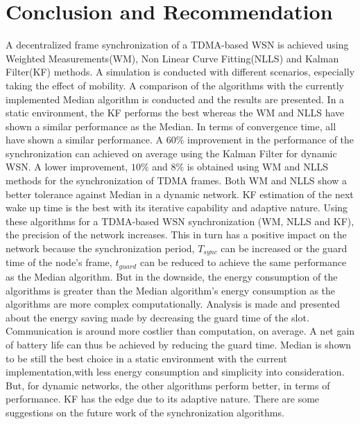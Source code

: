 \documentclass[journal]{IEEEtran}
\begin{document}
\section{\textbf{Conclusion and Recommendation}}\noindent
A decentralized frame synchronization of a TDMA-based WSN is achieved
using Weighted Measurements(WM), Non Linear Curve Fitting(NLLS) and
Kalman Filter(KF) methods. A simulation is conducted with different scenarios, especially
taking the effect of mobility. A comparison of the algorithms with the currently implemented Median algorithm
is conducted and the results are presented.
\newline
In a static environment, the KF performs the best whereas the WM and NLLS have shown a similar performance as the
Median. In terms of convergence time, all have shown a similar performance.
\newline
A $60\%$ improvement in the performance of the synchronization can
achieved on average using the Kalman Filter for dynamic WSN. A lower
improvement, $10\%$ and $8\%$ is obtained using WM and NLLS methods
for the synchronization of TDMA frames. Both WM and NLLS show a better tolerance
against Median in a dynamic network. KF estimation of
the next wake up time is the best with its iterative capability and
adaptive nature.
\newline
Using these algorithms for a TDMA-based WSN synchronization (WM, NLLS and KF), the precision of the network increases.
This in turn has a positive impact on the network because the synchronization period,
$T_{sync}$ can be increased or the guard time of the node's frame,
$t_{guard}$ can be reduced to achieve the same performance as the
Median algorithm. 
\newline
But in the downside, the energy consumption of the algorithms is
greater than the Median algorithm's energy consumption as the algorithms are more complex computationally. Analysis is made and presented about the
energy saving made by decreasing the guard time of the slot. 
Communication is around more costlier than computation, on average. A net gain of battery life can thus be achieved by reducing the guard time.
\newline
Median is shown to be still the best choice in a static environment with the current implementation,with less energy consumption and simplicity into consideration. But, for dynamic networks, the other algorithms perform better, in terms of
performance. KF has the edge due to its adaptive nature.
\newline 
\noindent There are some suggestions on the future work of the synchronization algorithms.
\end{document}
